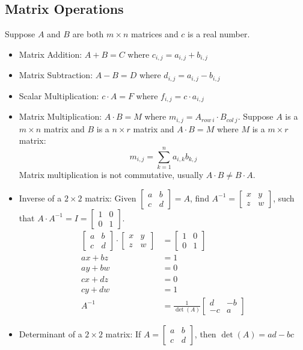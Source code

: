 \documentclass[letterpaper, 12pt]{math}
\begin{document}
\subsection*{Matrix Operations}
Suppose \( A \) and \( B \) are both \( m\times n \) matrices and \( c \) is
a real number.
\begin{itemize}
  \item Matrix Addition: \( A+B = C \) where \( c_{i,j} = a_{i,j}+b_{i,j} \)
  \item Matrix Subtraction: \( A-B = D \) where \( d_{i,j} = a_{i,j}-b_{i,j} \)
  \item Scalar Multiplication: \( c\cdot A = F \) where \( f_{i,j} = c\cdot
    a_{i,j} \)
  \item Matrix Multiplication: \( A\cdot B = M \) where \( m_{i,j} = A_{row\ i}
    \cdot B_{col\ j} \). Suppose \( A \) is a \( m\times n \) matrix and \( B \)
    is a \( n\times r \) matrix and \( A\cdot B = M \) where \( M \) is a
    \( m\times r \) matrix:
    \[ m_{i,j} = \sum_{k=1}^{n}a_{i,k}b_{k,j} \]
    Matrix multiplication is not commutative, usually
    \( A\cdot B\neq B\cdot A \).
  \item Inverse of a \( 2\times2 \) matrix:
    Given \( \begin{bmatrix} a & b \\ c & d \end{bmatrix} = A \), find
    \( A^{-1} = \begin{bmatrix} x & y \\ z & w \end{bmatrix} \), such that
    \( A\cdot A^{-1} = I = \begin{bmatrix} 1 & 0 \\ 0 & 1 \end{bmatrix} \).
    \begin{align*}
      \begin{bmatrix} a & b \\ c & d \end{bmatrix}\cdot
      \begin{bmatrix} x & y \\ z & w \end{bmatrix} &=
      \begin{bmatrix} 1 & 0 \\ 0 & 1 \end{bmatrix} \\
      ax+bz &= 1 \\
      ay+bw &= 0 \\
      cx+dz &= 0 \\
      cy+dw &= 1 \\
      A^{-1} &= \frac{1}{\det(A)}\begin{bmatrix} d & -b \\ -c & a \end{bmatrix}
    \end{align*}
  \item Determinant of a \( 2\times2 \) matrix: If \( A = \begin{bmatrix} a & b
    \\ c & d \end{bmatrix} \), then \( \det(A) = ad-bc \)
\end{itemize}
\end{document}
